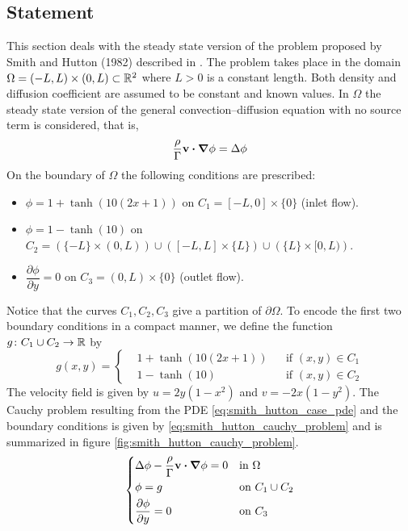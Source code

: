 
\subsection{Statement}

This section deals with the steady state version of the problem proposed by
Smith and Hutton (1982) described in \cite{smith1982numerical}. The problem
takes place in the domain $\Omega = (-L,L) \times (0,L) \subset \mathbb{R}^2$ where
$L > 0$ is a constant length. Both density and diffusion coefficient are assumed
to be constant and known values. In $\Omega$ the steady state version of the
general convection--diffusion equation with no source term is considered, that
is,
\begin{equation} \label{eq:smith_hutton_case_pde}
	\frac{\rho}{\Gamma} \vb{v} \vdot \grad{\phi} = \Delta{\phi}
\end{equation}
On the boundary of $\Omega$ the following conditions are prescribed:
\begin{itemize}[topsep=0pt]
	\item $\phi = 1 + \tanh(10(2x+1))$ on $C_1 = [-L,0] \times \{ 0 \}$ (inlet
	flow).
	\item $\phi = 1 - \tanh(10)$ on $C_2 = \left( \{ -L \} \times (0,L) \right)
	\cup \left( [-L,L] \times \{ L \} \right) \cup \left( \{ L \} \times [0,L)
	\right)$.
	\item $\dfrac{\partial \phi}{\partial y} = 0$ on $C_3 = (0,L) \times \{ 0
	\}$ (outlet flow).
\end{itemize}
Notice that the curves $C_1, C_2, C_3$ give a partition of $\partial \Omega$. To
encode the first two boundary conditions in a compact manner, we define the
function $g \colon C_1 \cup C_2 \rightarrow \mathbb{R}$ by
\begin{equation}
	g(x,y) = 
	\left\{
	\begin{aligned}
		&1 + \tanh(10(2x + 1)) 	& &\text{if } (x,y) \in C_1 \\
		&1 - \tanh(10) 			& &\text{if } (x,y) \in C_2
	\end{aligned}
	\right.
\end{equation}
The velocity field is given by $u = 2 y (1 - x^2)$ and $v = -2 x (1 - y^2)$. The
Cauchy problem resulting from the PDE \eqref{eq:smith_hutton_case_pde} and the
boundary conditions is given by \eqref{eq:smith_hutton_cauchy_problem} and is
summarized in figure \ref{fig:smith_hutton_cauchy_problem}.
\begin{equation} \label{eq:smith_hutton_cauchy_problem} 
	\left\{
	\begin{aligned}
		&\Delta \phi - \frac{\rho}{\Gamma} \vb{v} \vdot \grad{\phi} = 0 &
		&\text{in } \Omega \\
		&\phi = g & 
		&\text{on } C_1 \cup C_2 \\
		&\frac{\partial \phi}{\partial y} = 0 & 
		&\text{on } C_3
	\end{aligned}
	\right.
\end{equation}

